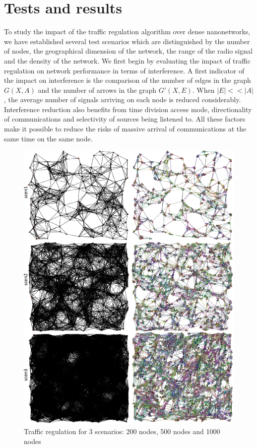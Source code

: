 \documentclass[letterpaper, 10 pt, conference]{ieeeconf}
\begin{document}
\section{Tests and results}

To study the impact of the traffic regulation algorithm over dense nanonetworks, we have established several test scenarios which are distinguished by the number of nodes, the geographical dimension of the network, the range of the radio signal and the density of the network. We first begin by evaluating the impact of traffic regulation on network performance in terms of interference. A first indicator of the impact on interference is the comparison of the number of edges in the graph $G(X, A)$ and the number of arrows in the graph $G'(X, E)$. When $ | E | << | A | $, the average number of signals arriving on each node is reduced considerably. Interference reduction also benefits from time division access mode, directionality of communications and selectivity of sources being listened to. All these factors make it possible to reduce the risks of massive arrival of communications at the same time on the same node.

\begin{figure}[h]
\centering
\includegraphics[width=\columnwidth]{nanonet.pdf}
\caption{Traffic regulation for 3 scenarios: 200 nodes, 500 nodes and 1000 nodes}
\label{nanonet}
\end{figure}
\end{document}
